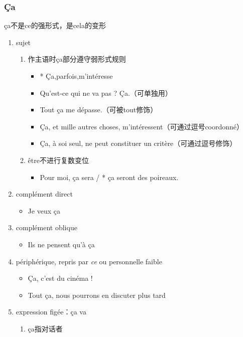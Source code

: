 \documentclass[UTF8]{report}
\begin{document}
\subsubsection{Ça}
ça不是ce的强形式，是cela的变形
\begin{enumerate}
    \item sujet
    \begin{enumerate}
        \item 作主语时ça部分遵守弱形式规则
        \begin{itemize}
            \item * Ça,parfois,m’intéresse
            \item Qu’est-ce qui ne va pas ? Ça.（可单独用）
            \item Tout ça me dépasse.（可被tout修饰）
            \item Ça, et mille autres choses, m’intéressent（可通过逗号coordonné）
            \item Ça, à soi seul, ne peut constituer un critère（可通过逗号修饰）
        \end{itemize}
        \item être不进行复数变位
        \begin{itemize}
            \item Pour moi, ça sera / * ça seront des poireaux.
        \end{itemize}
    \end{enumerate}
    \item complément direct
    \begin{itemize}
        \item Je veux ça 
    \end{itemize}
    \item complément oblique
    \begin{itemize}
        \item Ils ne pensent qu’à ça
    \end{itemize}
    \item périphérique, repris par \textit{ce} ou personnelle faible
    \begin{itemize}
        \item Ça, c’est du cinéma !
        \item Tout ça, nous pourrons en discuter plus tard
    \end{itemize}
    \item expression figée：ça va
    \begin{enumerate}
        \item ça指对话者
        \begin{itemize}

\end{itemize}
\end{enumerate}
\end{enumerate}
\end{document}
